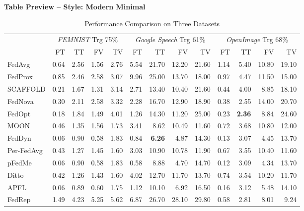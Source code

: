 \documentclass[conference]{IEEEtran}
\begin{document}
\onecolumn
\begin{center}
\Large\textbf{Table Preview -- Style: Modern Minimal}
\end{center}
\vspace{1em}
\begin{table}[t]
\centering
\caption{Performance Comparison on Three Datasets}
\label{tab:main-result}
\footnotesize

\begin{tabular}{lrrrrrrrrrrrr}
\toprule
 & \multicolumn{4}{c}{\textit{FEMNIST} Trg 75\%} & \multicolumn{4}{c}{\textit{Google Speech} Trg 61\%} & \multicolumn{4}{c}{\textit{OpenImage} Trg 68\%} \\
\cmidrule(lr){2-5} \cmidrule(lr){6-9} \cmidrule(lr){10-13}
 & FT & TT & FV & TV & FT & TT & FV & TV & FT & TT & FV & TV \\
\cmidrule(lr){2-5} \cmidrule(lr){6-9} \cmidrule(lr){10-13}
FedAvg & 0.64 & 2.56 & 1.56 & 2.76 & 5.54 & 21.70 & 12.20 & 21.60 & 1.14 & 5.40 & 10.80 & 19.10 \\
\rowcolor{gray!10} FedProx & 0.85 & 2.46 & 2.58 & 3.07 & 9.96 & 25.00 & 13.70 & 18.00 & 0.97 & 4.47 & 11.50 & 15.00 \\
SCAFFOLD & 0.21 & 1.67 & 1.31 & 3.14 & 2.71 & 13.40 & 10.40 & 21.60 & 0.44 & 4.00 & 8.85 & 18.10 \\
\rowcolor{gray!10} FedNova & 0.30 & 2.11 & 2.58 & 3.32 & 2.28 & 16.70 & 12.90 & 18.90 & 0.38 & 2.55 & 14.00 & 20.70 \\
FedOpt & 0.18 & 1.84 & 1.49 & 4.01 & 1.26 & 14.30 & 11.20 & 25.00 & 0.23 & \textbf{2.36} & 8.84 & 24.60 \\
\rowcolor{gray!10} MOON & 0.46 & 1.35 & 1.56 & 1.73 & 3.41 & 8.62 & 10.49 & 11.60 & 0.72 & 3.68 & 10.80 & 12.00 \\
FedDyn & 0.06 & 0.90 & 0.58 & 1.83 & 0.84 & \textbf{6.26} & 4.87 & 14.30 & 0.13 & 3.07 & 4.45 & 13.70 \\
\rowcolor{gray!10} Per-FedAvg & 0.43 & 1.27 & 1.45 & 1.60 & 3.03 & 10.90 & 10.78 & 11.90 & 0.67 & 3.55 & 10.40 & 11.60 \\
pFedMe & 0.06 & 0.90 & 0.58 & 1.83 & 0.58 & 8.88 & 4.70 & 14.70 & 0.12 & 3.09 & 4.34 & 13.70 \\
\rowcolor{gray!10} Ditto & 0.42 & 1.26 & 1.43 & 1.60 & 4.02 & 12.70 & 11.70 & 13.70 & 0.74 & 3.54 & 10.20 & 11.70 \\
APFL & 0.06 & 0.89 & 0.60 & 1.75 & 1.12 & 10.10 & 6.92 & 16.50 & 0.16 & 3.12 & 5.48 & 14.10 \\
\rowcolor{gray!10} FedRep & 1.49 & 4.23 & 5.25 & 5.62 & 6.87 & 26.70 & 28.10 & 29.80 & 0.58 & 2.81 & 8.01 & 9.24 \\

\end{tabular}
\end{table}
\end{document}
